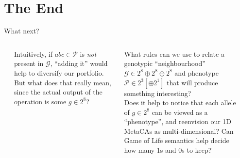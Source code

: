 \part{The End}
\frame{\partpage}

\begin{frame}[fragile]{What next?}{}
\begin{columns}[]
\begin{column}[T]{.1cm}
\end{column}
\begin{column}[T]{5.4cm}
\vspace*{.2cm}

{\small Intuitively, if $abc\in\mathcal{P}$ is \emph{not} present in $\mathcal{G}$,
  ``adding it'' would help to diversify our
portfolio.  But what does that really mean, since the
actual output of the operation is some $g\in2^8$?}
\end{column}
\begin{column}[T]{5.3cm}
\vspace{-.05in}
{\small What rules can we use to relate a genotypic ``neighbourhood'' $\mathcal{G}\in 2^8\oplus2^8\oplus2^8$
and phenotype $\mathcal{P}\in 2^3 [\oplus2^1]$ that will produce
something interesting?} \\[.3cm]
\vspace{.1in}
{\small Does it help to notice that each allele of $g\in2^8$ can be viewed as
a ``phenotype'', and reenvision our 1D MetaCAs as multi-dimensional?  Can Game of Life semantics help decide how many 1s and 0s to keep?}
\end{column}
\begin{column}[T]{.1cm}
\end{column}
\end{columns}
\end{frame}


